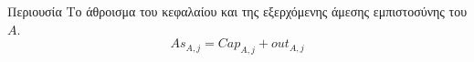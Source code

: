 {}
\begin{definitiongr}{Περιουσία}
  Το άθροισμα του κεφαλαίου και της εξερχόμενης άμεσης εμπιστοσύνης του $A$.
  \begin{equation}
    As_{A, j} = Cap_{A, j} + out_{A, j}
  \end{equation}
\end{definitiongr}

